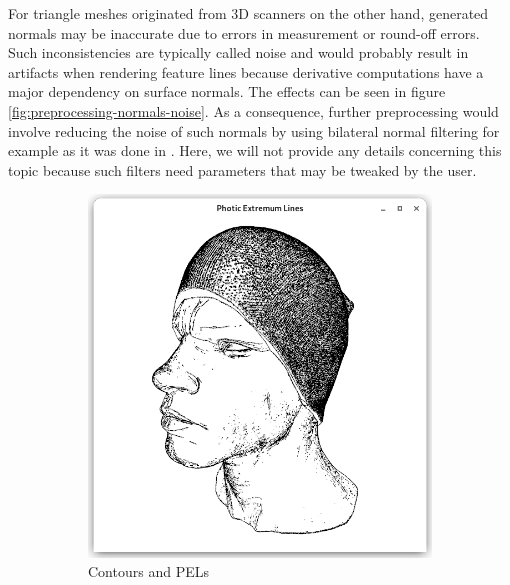 \documentclass[9pt,fleqn,twoside,twocolumn]{stdglobal}
\begin{document}
    For triangle meshes originated from 3D scanners on the other hand, generated normals may be inaccurate due to errors in measurement or round-off errors.
    Such inconsistencies are typically called noise and would probably result in artifacts when rendering feature lines because derivative computations have a major dependency on surface normals.
    The effects can be seen in figure \ref{fig:preprocessing-normals-noise}.
    As a consequence, further preprocessing would involve reducing the noise of such normals by using bilateral normal filtering for example as it was done in \textcite{xie2007}.
    Here, we will not provide any details concerning this topic because such filters need parameters that may be tweaked by the user.

    \begin{figure}[t]
      \centering
      \begin{subfigure}[b]{0.49\linewidth}
        \centering
        \includegraphics[width=\textwidth,trim={15px 15 15 50},clip]{images/head-contour-pel-shader.png}
        \caption{Contours and PELs}
      \end{subfigure}
      \begin{subfigure}[b]{0.49\linewidth}
        \centering

\end{subfigure}
\end{figure}
\end{document}
